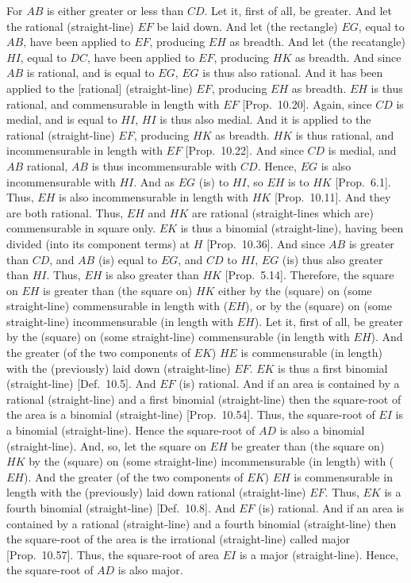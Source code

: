 For $AB$ is either greater or less than $CD$. Let it, first of all,
be greater. And let the rational (straight-line) $EF$ be laid down. And
let (the rectangle) $EG$, equal to $AB$, have been applied to $EF$,
producing $EH$ as breadth. And let (the recatangle) $HI$, equal to $DC$,
have been applied to $EF$, producing $HK$ as breadth. And since
$AB$ is rational, and is equal to $EG$, $EG$ is thus also rational. And it
has been applied to the [rational] (straight-line) $EF$, producing $EH$
as breadth. $EH$ is thus rational, and commensurable in length
with $EF$ [Prop.~10.20]. Again, since
$CD$ is medial, and is equal to $HI$, $HI$ is thus also medial. 
And it is applied to the rational (straight-line) $EF$, producing
$HK$ as breadth. $HK$ is thus rational, and incommensurable
in length with $EF$ [Prop.~10.22]. And since
$CD$ is medial, and $AB$ rational, $AB$ is thus incommensurable
with $CD$. Hence, $EG$ is also incommensurable with $HI$. And
as $EG$ (is) to $HI$, so $EH$ is to $HK$ [Prop.~6.1].
Thus, $EH$ is also incommensurable in length with $HK$
[Prop.~10.11]. And they are both rational. Thus,
$EH$ and $HK$ are rational (straight-lines which are) commensurable in
 square only. $EK$ is thus a binomial (straight-line), having been divided
(into its component terms) at $H$ [Prop.~10.36].
And since $AB$ is greater than $CD$, and $AB$ (is) equal to $EG$, and
$CD$ to $HI$, $EG$ (is) thus also greater than $HI$. Thus, $EH$
is also greater than $HK$ [Prop.~5.14]. Therefore,
 the square on $EH$ is greater than (the square on) $HK$
either by the (square) on (some straight-line) commensurable in length
with ($EH$), or by the (square) on (some straight-line)  incommensurable
(in length with $EH$). 
Let it, first of all, be greater by the (square) on (some straight-line)
commensurable (in length with $EH$). And the greater (of the two components of $EK$) $HE$ is commensurable
(in length) with the (previously) laid down (straight-line) $EF$. $EK$ is thus a first binomial
(straight-line) [Def.~10.5]. And $EF$ (is) rational. And if an area is contained by a rational (straight-line) and a first
binomial (straight-line) then the square-root  of the  area is a binomial
(straight-line)  [Prop.~10.54]. Thus,
the square-root of $EI$ is a binomial (straight-line). Hence the square-root of $AD$ is also a binomial (straight-line).  And, so, let the
 square on $EH$ be greater than (the square on) $HK$ by the (square) on 
 (some straight-line) incommensurable (in length) with ($EH$). And the
 greater (of the two components of $EK$) $EH$ is commensurable in length with the (previously)
 laid down rational (straight-line) $EF$. Thus, $EK$ is a fourth
 binomial (straight-line) [Def.~10.8]. And
 $EF$ (is) rational. And if an area
 is contained by a rational (straight-line) and a fourth binomial (straight-line) 
 then the square-root of the area is the irrational (straight-line) called
 major [Prop.~10.57]. Thus, the square-root
 of area $EI$ is a major (straight-line). Hence, the square-root of
 $AD$ is also major.
 
